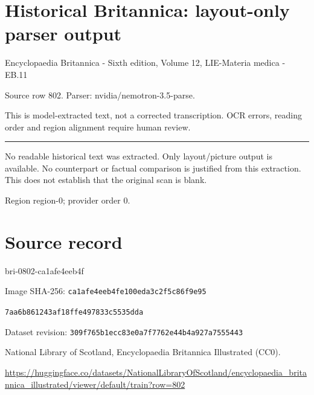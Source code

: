 \documentclass[11pt]{article}
\begin{document}
\section*{Historical Britannica: layout-only parser output}
Encyclopaedia Britannica - Sixth edition, Volume 12, LIE-Materia medica - EB.11\par
{\small Source row 802. Parser: nvidia/nemotron-3.5-parse.\par}
{\small This is model-extracted text, not a corrected transcription. OCR errors, reading order and region alignment require human review.\par}
\hrule\medskip
{\color{red} No readable historical text was extracted. Only layout/picture output is available. No counterpart or factual comparison is justified from this extraction. This does not establish that the original scan is blank.\par}


\par

{\scriptsize\color{gray} Region region-0; provider order 0.\par}
\medskip
\newpage\section*{Source record}
bri-0802-ca1afe4eeb4f\par
Image SHA-256: \texttt{ca1afe4eeb4fe100eda3c2f5c86f9e95}\par\texttt{7aa6b861243af18ffe497833c5535dda}\par
Dataset revision: \texttt{309f765b1ecc83e0a7f7}\texttt{762e44b4a927a7555443}\par
National Library of Scotland, Encyclopaedia Britannica Illustrated (CC0).\par
\url{https://huggingface.co/datasets/NationalLibraryOfScotland/encyclopaedia_britannica_illustrated/viewer/default/train?row=802}
\end{document}
